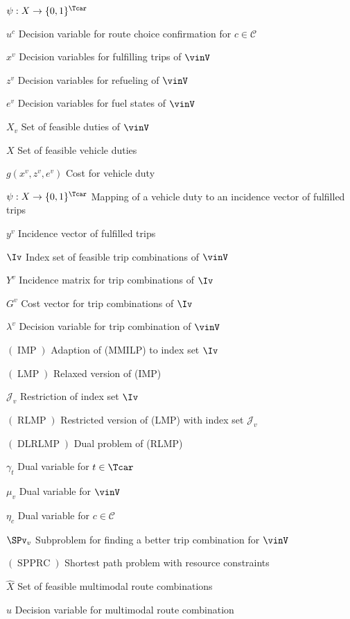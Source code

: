 \begin{labeling}{$\psi:X\to\{0,1\}^{\Tcar}$}
	\item[$u^c$]{Decision variable for route choice confirmation for $c\in\mathcal{C}$}
	\item[$x^v$]{Decision variables for fulfilling trips of $\vinV$}
	\item[$z^v$]{Decision variables for refueling of $\vinV$}
	\item[$e^v$]{Decision variables for fuel states of $\vinV$}
	\item[$X_v$]{Set of feasible duties of $\vinV$}
	\item[$X$]{Set of feasible vehicle duties}
	\item[$g\left(x^v,z^v,e^v\right)$]{Cost for vehicle duty}
	\item[$\psi:X\to\{0,1\}^{\Tcar}$]{Mapping of a vehicle duty to an incidence vector of fulfilled trips}
	\item[$y^v$]{Incidence vector of fulfilled trips}
	\item[$\Iv$]{Index set of feasible trip combinations of $\vinV$}
	\item[$Y^v$]{Incidence matrix for trip combinations of $\Iv$}
	\item[$G^v$]{Cost vector for trip combinations of $\Iv$}
	\item[$\lambda^v$]{Decision variable for trip combination of $\vinV$}
	\item[$(\operatorname{IMP})$]{Adaption of (MMILP) to index set $\Iv$}
	\item[$(\operatorname{LMP})$]{Relaxed version of (IMP)}
	\item[$\mathcal{J}_v$]{Restriction of index set $\Iv$}
	\item[$(\operatorname{RLMP})$]{Restricted version of (LMP) with index set $\mathcal{J}_v$}
	\item[$(\operatorname{DLRLMP})$]{Dual problem of (RLMP)}
	\item[$\gamma_t$]{Dual variable for $t\in\Tcar$}
	\item[$\mu_v$]{Dual variable for $\vinV$}
	\item[$\eta_c$]{Dual variable for $c\in\mathcal{C}$}
	\item[$\SPv_v$]{Subproblem for finding a better trip combination for $\vinV$}
	\item[$(\operatorname{SPPRC})$]{Shortest path problem with resource constraints}
	\item[$\hat{X}$]{Set of feasible multimodal route combinations}
	\item[$\hat{u}$]{Decision variable for multimodal route combination}

\end{labeling}
